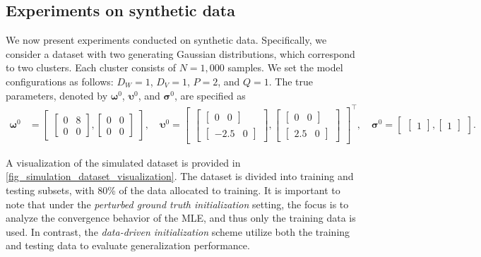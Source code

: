 \documentclass{article}
\def\vsigma{{\bm{\sigma}}}
\def\vomega{{\bm{\omega}}}
\def\vupsilon{{\bm{\upsilon}}}
\begin{document}
\subsection{Experiments on synthetic data}
We now present experiments conducted on synthetic data. Specifically, we consider a dataset with two generating Gaussian distributions, which correspond to two clusters. Each cluster consists of $N = 1,000$ samples. We set the model configurations as follows: $D_W = 1$, $D_V = 1$, $P = 2$, and $Q = 1$. The true parameters, denoted by $\boldsymbol{\omega}^0$, $\boldsymbol{\upsilon}^0$, and $\boldsymbol{\sigma}^0$, are specified as
\begin{align*}
\vomega^{0} &=
\begin{bmatrix}
\begin{bmatrix}
0 & 8 \\
0 & 0
\end{bmatrix},
\begin{bmatrix}
0 & 0 \\
0 & 0
\end{bmatrix}
\end{bmatrix}, \quad 
\vupsilon^{0} =
\begin{bmatrix}
\begin{bmatrix}
\begin{bmatrix} 0 & 0 \end{bmatrix} \\
\begin{bmatrix} -2.5 & 0 \end{bmatrix}
\end{bmatrix}, 
\begin{bmatrix}
\begin{bmatrix} 0 & 0 \end{bmatrix} \\
\begin{bmatrix} 2.5 & 0 \end{bmatrix}
\end{bmatrix}
\end{bmatrix}^\top, \quad
\vsigma^{0} =
\begin{bmatrix}
\begin{bmatrix} 1 \end{bmatrix},
\begin{bmatrix} 1 \end{bmatrix}
\end{bmatrix}.
\end{align*}

A visualization of the simulated dataset is provided in \cref{fig_simulation_dataset_visualization}. The dataset is divided into training and testing subsets, with 80\% of the data allocated to training.  It is important to note that under the \emph{perturbed ground truth initialization} setting, the focus is to analyze the convergence behavior of the MLE, and thus only the training data is used. In contrast, the \emph{data-driven initialization} scheme utilize both the training and testing data to evaluate generalization performance.
\end{document}
